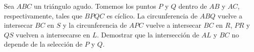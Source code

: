 Sea $ ABC$ un triángulo agudo. Tomemos los puntos $ P$ y $ Q$ dentro de $ AB$ y $ AC$, respectivamente, tales que $ BPQC$ es cíclico. La circunferencia de $ ABQ$ vuelve a intersecar $ BC$ en $ S$ y la circunferencia de $ APC$ vuelve a intersecar $ BC$ en $ R$, $ PR$ y $ QS$ vuelven a intersecarse en $ L$. Demostrar que la intersección de $ AL$ y $ BC$ no depende de la selección de $ P$ y $ Q$.
